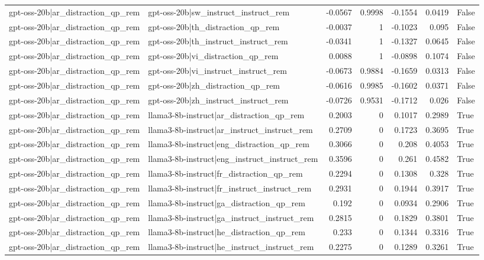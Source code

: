 \begin{table}
\begin{tabular}{l l r r r r l}
gpt-oss-20b|ar_distraction_qp_rem & gpt-oss-20b|sw_instruct_instruct_rem & -0.0567 & 0.9998 & -0.1554 & 0.0419 & False \\
gpt-oss-20b|ar_distraction_qp_rem & gpt-oss-20b|th_distraction_qp_rem & -0.0037 & 1 & -0.1023 & 0.095 & False \\
gpt-oss-20b|ar_distraction_qp_rem & gpt-oss-20b|th_instruct_instruct_rem & -0.0341 & 1 & -0.1327 & 0.0645 & False \\
gpt-oss-20b|ar_distraction_qp_rem & gpt-oss-20b|vi_distraction_qp_rem & 0.0088 & 1 & -0.0898 & 0.1074 & False \\
gpt-oss-20b|ar_distraction_qp_rem & gpt-oss-20b|vi_instruct_instruct_rem & -0.0673 & 0.9884 & -0.1659 & 0.0313 & False \\
gpt-oss-20b|ar_distraction_qp_rem & gpt-oss-20b|zh_distraction_qp_rem & -0.0616 & 0.9985 & -0.1602 & 0.0371 & False \\
gpt-oss-20b|ar_distraction_qp_rem & gpt-oss-20b|zh_instruct_instruct_rem & -0.0726 & 0.9531 & -0.1712 & 0.026 & False \\
gpt-oss-20b|ar_distraction_qp_rem & llama3-8b-instruct|ar_distraction_qp_rem & 0.2003 & 0 & 0.1017 & 0.2989 & True \\
gpt-oss-20b|ar_distraction_qp_rem & llama3-8b-instruct|ar_instruct_instruct_rem & 0.2709 & 0 & 0.1723 & 0.3695 & True \\
gpt-oss-20b|ar_distraction_qp_rem & llama3-8b-instruct|eng_distraction_qp_rem & 0.3066 & 0 & 0.208 & 0.4053 & True \\
gpt-oss-20b|ar_distraction_qp_rem & llama3-8b-instruct|eng_instruct_instruct_rem & 0.3596 & 0 & 0.261 & 0.4582 & True \\
gpt-oss-20b|ar_distraction_qp_rem & llama3-8b-instruct|fr_distraction_qp_rem & 0.2294 & 0 & 0.1308 & 0.328 & True \\
gpt-oss-20b|ar_distraction_qp_rem & llama3-8b-instruct|fr_instruct_instruct_rem & 0.2931 & 0 & 0.1944 & 0.3917 & True \\
gpt-oss-20b|ar_distraction_qp_rem & llama3-8b-instruct|ga_distraction_qp_rem & 0.192 & 0 & 0.0934 & 0.2906 & True \\
gpt-oss-20b|ar_distraction_qp_rem & llama3-8b-instruct|ga_instruct_instruct_rem & 0.2815 & 0 & 0.1829 & 0.3801 & True \\
gpt-oss-20b|ar_distraction_qp_rem & llama3-8b-instruct|he_distraction_qp_rem & 0.233 & 0 & 0.1344 & 0.3316 & True \\
gpt-oss-20b|ar_distraction_qp_rem & llama3-8b-instruct|he_instruct_instruct_rem & 0.2275 & 0 & 0.1289 & 0.3261 & True \\

\end{tabular}
\end{table}
